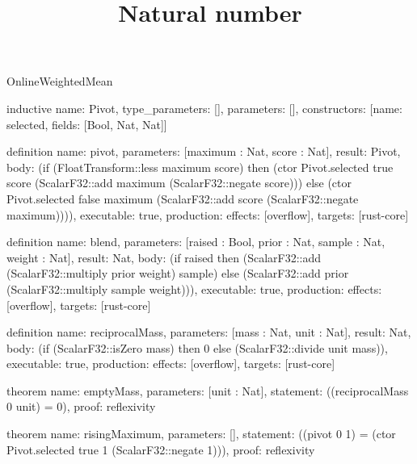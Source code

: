 \begin{lexlean}{OnlineWeightedMean}
\title{Natural number}
\begin{semanticmodule}
inductive{
  name: Pivot,
  type_parameters: [],
  parameters: [],
  constructors: [{name: selected, fields: [Bool, Nat, Nat]}]
}

definition{
  name: pivot,
  parameters: [maximum : Nat, score : Nat],
  result: Pivot,
  body: (if (FloatTransform::less maximum score) then (ctor Pivot.selected true score (ScalarF32::add maximum (ScalarF32::negate score))) else (ctor Pivot.selected false maximum (ScalarF32::add score (ScalarF32::negate maximum)))),
  executable: true,
  production: {effects: [overflow], targets: [rust-core]}
}

definition{
  name: blend,
  parameters: [raised : Bool, prior : Nat, sample : Nat, weight : Nat],
  result: Nat,
  body: (if raised then (ScalarF32::add (ScalarF32::multiply prior weight) sample) else (ScalarF32::add prior (ScalarF32::multiply sample weight))),
  executable: true,
  production: {effects: [overflow], targets: [rust-core]}
}

definition{
  name: reciprocalMass,
  parameters: [mass : Nat, unit : Nat],
  result: Nat,
  body: (if (ScalarF32::isZero mass) then 0 else (ScalarF32::divide unit mass)),
  executable: true,
  production: {effects: [overflow], targets: [rust-core]}
}

theorem{
  name: emptyMass,
  parameters: [unit : Nat],
  statement: ((reciprocalMass 0 unit) = 0),
  proof: reflexivity{}
}

theorem{
  name: risingMaximum,
  parameters: [],
  statement: ((pivot 0 1) = (ctor Pivot.selected true 1 (ScalarF32::negate 1))),
  proof: reflexivity{}
}
\end{semanticmodule}
\end{lexlean}
